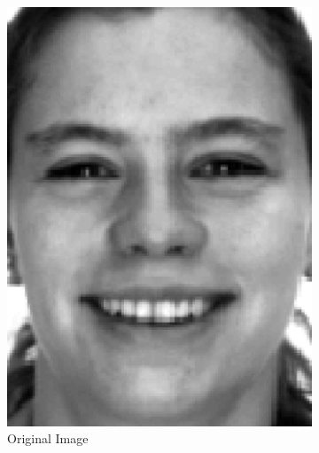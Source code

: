 \documentclass[review]{elsarticle}
\begin{document}
\begin{figure}[H]
 \hspace*{\fill}
\centering
\begin{subfigure}[b]{0.18\textwidth}
\centering
	\includegraphics[width=\linewidth]{Fig_4a}
		\caption{Original Image}
	\label{fig:orig_image_ex_2} \hfill
\end{subfigure}
\begin{subfigure}[b]{0.18\textwidth} 
\centering

\end{subfigure}
\end{figure}
\end{document}
